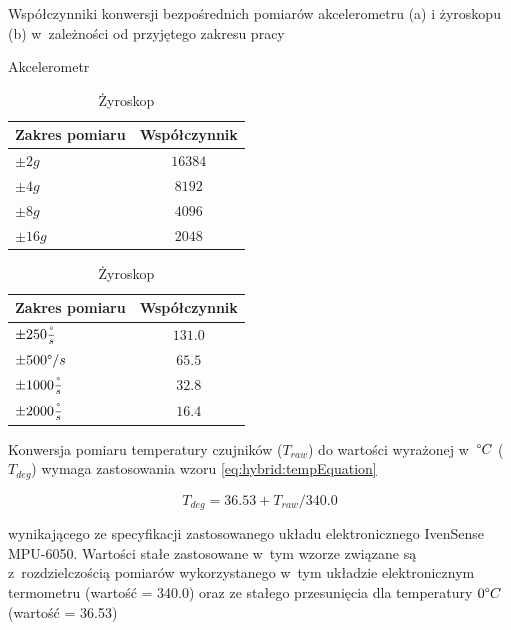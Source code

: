 \begin{savenotes}
	\begin{table}[!htb]
		\caption{Współczynniki konwersji bezpośrednich pomiarów akcelerometru (a) i żyroskopu (b) w~zależności od przyjętego zakresu pracy}
		\begin{subtable}{.5\linewidth}
			\centering
			\caption{Akcelerometr}
			\label{tab:hybrid:accRangeFactors} 
			\begin{tabular}{|l|c|}
				\hline
				Zakres pomiaru              & Współczynnik \\ \hline
				$\pm2g$                     & $16384$        \\ \hline
				\rowcolor{black!20} $\pm4g$ & $8192$         \\ \hline
				$\pm8g$                     & $4096$         \\ \hline
				$\pm16g$                    & $2048$         \\ \hline
			\end{tabular}
		\end{subtable}%
		\begin{subtable}{.5\linewidth}
			\centering
			\caption{Żyroskop}
			\label{tab:hybrid:gyroRangeFactors}	
			\begin{tabular}{|l|c|}
				\hline
				Zakres pomiaru                        & Współczynnik \\ \hline
				$\pm250\frac{\degree}{s}$             & $131.0$        \\ \hline
				\rowcolor{black!20} $\pm500\degree/s$ & $65.5$         \\ \hline
				$\pm1000\frac{\degree}{s}$            & $32.8$         \\ \hline
				$\pm2000\frac{\degree}{s}$            & $16.4$         \\ \hline
			\end{tabular}
		\end{subtable} 
	\end{table}
\end{savenotes}	
		
		
Konwersja pomiaru temperatury czujników ($T_{raw}$) do wartości wyrażonej w~$\degree C$ ($T_{deg}$) wymaga zastosowania wzoru \ref{eq:hybrid:tempEquation}

\begin{equation}
	T_{deg} = 36.53 + T_{raw} / 340.0
	\label{eq:hybrid:tempEquation}
\end{equation}

wynikającego ze specyfikacji zastosowanego układu elektronicznego IvenSense MPU-6050. Wartości stałe zastosowane w~tym wzorze związane są z~rozdzielczością pomiarów wykorzystanego w~tym układzie elektronicznym termometru (wartość = 340.0) oraz ze stałego przesunięcia dla temperatury $0 \degree C$ (wartość = 36.53)
				
